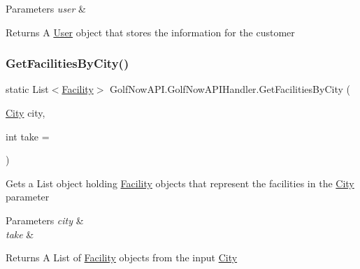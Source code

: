 \begin{DoxyParams}{Parameters}
{\em user} & \\
\hline
\end{DoxyParams}
\begin{DoxyReturn}{Returns}
A \mbox{\hyperlink{class_golf_now_a_p_i_1_1_user}{User}} object that stores the information for the customer
\end{DoxyReturn}
\mbox{\label{class_golf_now_a_p_i_1_1_golf_now_a_p_i_handler_aaa4165dc6e7f348d02ba4dadfac977c3}} 
\subsubsection{\texorpdfstring{GetFacilitiesByCity()}{GetFacilitiesByCity()}}
{\footnotesize\ttfamily static List$<$\mbox{\hyperlink{class_golf_now_a_p_i_1_1_facility}{Facility}}$>$ Golf\+Now\+A\+P\+I.\+Golf\+Now\+A\+P\+I\+Handler.\+Get\+Facilities\+By\+City (\begin{DoxyParamCaption}\item[{\mbox{\hyperlink{class_golf_now_a_p_i_1_1_city}{City}}}]{city,  }\item[{int}]{take = {} }\end{DoxyParamCaption})\hspace{0.3cm}{\ttfamily [static]}}



Gets a List object holding \mbox{\hyperlink{class_golf_now_a_p_i_1_1_facility}{Facility}} objects that represent the facilities in the \mbox{\hyperlink{class_golf_now_a_p_i_1_1_city}{City}} parameter 


\begin{DoxyParams}{Parameters}
{\em city} & \\
\hline
{\em take} & \\
\hline
\end{DoxyParams}
\begin{DoxyReturn}{Returns}
A List of \mbox{\hyperlink{class_golf_now_a_p_i_1_1_facility}{Facility}} objects from the input \mbox{\hyperlink{class_golf_now_a_p_i_1_1_city}{City}}
\end{DoxyReturn}
\mbox{\label{class_golf_now_a_p_i_1_1_golf_now_a_p_i_handler_a944de1a0c317adc059274c10a7d444cd}} 
